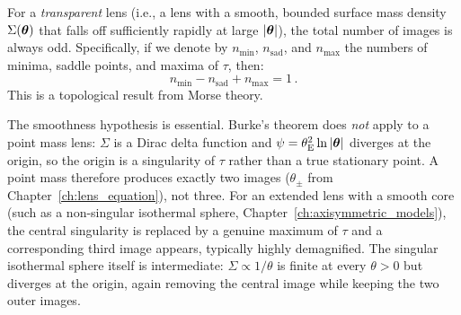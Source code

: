 \begin{theorem}
\label{thm:odd_number}
For a \emph{transparent} lens (i.e., a lens with a smooth, bounded
surface mass density $\Sigma(\boldsymbol{\theta})$ that falls off sufficiently
rapidly at large $|\boldsymbol{\theta}|$), the total number of images is always
odd.  Specifically, if we denote by $n_{\mathrm{min}}$,
$n_{\mathrm{sad}}$, and $n_{\mathrm{max}}$ the numbers of minima,
saddle points, and maxima of $\tau$, then:
\begin{equation}
    n_{\mathrm{min}} - n_{\mathrm{sad}} + n_{\mathrm{max}} = 1 \,.
    \label{eq:odd_number}
\end{equation}
This is a topological result from Morse theory.
\end{theorem}

\begin{remark}
The smoothness hypothesis is essential.  Burke's theorem does
\emph{not} apply to a point mass lens: $\Sigma$ is a Dirac
delta function and $\psi = \theta_{\mathrm{E}}^2\ln|\boldsymbol{\theta}|$ diverges at the
origin, so the origin is a singularity of $\tau$ rather than a true
stationary point.  A point mass therefore produces exactly two images
($\theta_\pm$ from Chapter~\ref{ch:lens_equation}), not three.  For an
extended lens with a smooth core (such as a non-singular isothermal
sphere, Chapter~\ref{ch:axisymmetric_models}), the central singularity is replaced by a genuine
maximum of $\tau$ and a corresponding third image appears, typically
highly demagnified.  The singular isothermal sphere itself is
intermediate: $\Sigma\!\propto\!1/\theta$ is finite at every $\theta>0$
but diverges at the origin, again removing the central image while
keeping the two outer images.
\end{remark}


